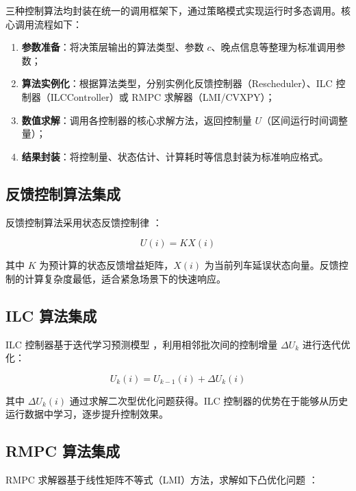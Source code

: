 三种控制算法均封装在统一的调用框架下，通过策略模式实现运行时多态调用。核心调用流程如下：

\begin{enumerate}
    \item \textbf{参数准备}：将决策层输出的算法类型、参数 $c$、晚点信息等整理为标准调用参数；
    \item \textbf{算法实例化}：根据算法类型，分别实例化反馈控制器（Rescheduler）、ILC 控制器（ILCController）或 RMPC 求解器（LMI/CVXPY）；
    \item \textbf{数值求解}：调用各控制器的核心求解方法，返回控制量 $U$（区间运行时间调整量）；
    \item \textbf{结果封装}：将控制量、状态估计、计算耗时等信息封装为标准响应格式。
\end{enumerate}

\subsection{反馈控制算法集成}

反馈控制算法采用状态反馈控制律 \cite{Kang2024}：

\begin{equation}
    U(i) = K X(i)
    \label{eq:feedback_law}
\end{equation}

其中 $K$ 为预计算的状态反馈增益矩阵，$X(i)$ 为当前列车延误状态向量。反馈控制的计算复杂度最低，适合紧急场景下的快速响应。

\subsection{ILC 算法集成}

ILC 控制器基于迭代学习预测模型 \cite{VanBreusegem1991}，利用相邻批次间的控制增量 $\Delta U_k$ 进行迭代优化：

\begin{equation}
    U_k(i) = U_{k-1}(i) + \Delta U_k(i)
    \label{eq:ilc_update}
\end{equation}

其中 $\Delta U_k(i)$ 通过求解二次型优化问题获得。ILC 控制器的优势在于能够从历史运行数据中学习，逐步提升控制效果。

\subsection{RMPC 算法集成}

RMPC 求解器基于线性矩阵不等式（LMI）方法，求解如下凸优化问题 \cite{Kothare1996}：

